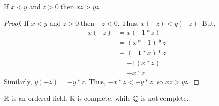 \begin{theorem}
    If $x < y$ and $z > 0$ then $xz > yz$.
\end{theorem}
\begin{proof}
    If $x < y$ and $z > 0$ then $-z < 0$. Thus, $x(-z) < y(-z)$. But,
    \begin{align*}
        x(-z) &= x(-1 * z) \\
        &= (x * -1) * z \\
        &= (-1 * x) * z \\
        &= -1 (x * z) \\
        &= -x * z
    \end{align*}
    Similarly, $y(-z) = -y * z$. Thus, $-x * z < -y * z$, so $xz > yz$.
\end{proof}

\begin{remark}[Completeness of $\R$]
    $\R$ is an ordered field. $\R$ is complete, while $\mathbb{Q}$ is not complete.
\end{remark}